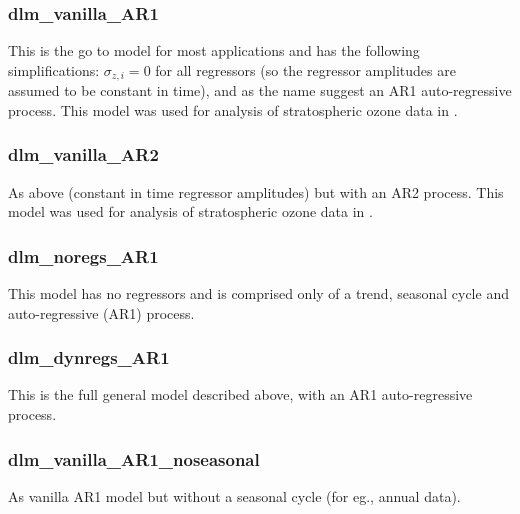\documentclass[a4paper, oneside, final]{scrartcl}
\begin{document}
\subsubsection*{dlm\_vanilla\_AR1}
This is the go to model for most applications and has the following simplifications: $\sigma_{z,i} = 0$ for all regressors (so the regressor amplitudes are assumed to be constant in time), and as the name suggest an AR1 auto-regressive process. This model was used for analysis of stratospheric ozone data in \citet{ball2017}.
%
\subsubsection*{dlm\_vanilla\_AR2}
As above (constant in time regressor amplitudes) but with an AR2 process. This model was used for analysis of stratospheric ozone data in \citet{ball2018}.
%
\subsubsection*{dlm\_noregs\_AR1}
This model has no regressors and is comprised only of a trend, seasonal cycle and auto-regressive (AR1) process.
%
\subsubsection*{dlm\_dynregs\_AR1}
This is the full general model described above, with an AR1 auto-regressive process.
%
\subsubsection*{dlm\_vanilla\_AR1\_noseasonal}
As vanilla AR1 model but without a seasonal cycle (for eg., annual data).
%
\end{document}
